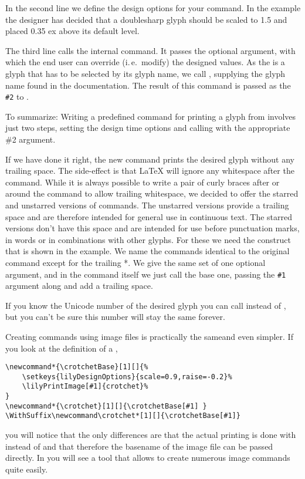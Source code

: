 \documentclass{OLLbook}
\begin{document}
In the second line we define the design options for your command.
In the example the designer has decided that a doublesharp glyph should be scaled to 1.5 and placed 0.35 ex above its default level.

The third line calls the internal  command. 
It passes the optional argument, with which the end user can override (i.\,e.\ modify) the designed values.
As the \doublesharp is a glyph that has to be selected by its glyph name, we call , supplying the glyph name found in the documentation.
The result of this command is passed as the \texttt{\#2} to .

To summarize: Writing a predefined command for printing a glyph from \emmentaler involves just two steps, setting the design time options and calling  with the appropriate \#2 argument.

\medskip
If we have done it right, the new command prints the desired glyph without any trailing space. 
The side-effect is that \LaTeX{} will ignore any whitespace after the command.
While it is always possible to write a pair of curly braces after or around the command to allow trailing whitespace, we decided to offer the starred and unstarred versions of commands.
The unstarred versions provide a trailing space and are therefore intended for general use in continuous text. 
The starred versions don't have this space and are intended for use before punctuation marks, in words or in combinations with other glyphs.
For these we need the  construct that is shown in the example.
We name the commands identical to the original command except for the trailing *.
We give the same set of one optional argument, and in the command itself we just call the base one, passing the \texttt{\#1} argument along and add a trailing space.

\medskip
If you know the Unicode number of the desired glyph you can call  instead of , but you can't be sure this number will stay the same forever.

\medskip
Creating commands using image files is practically the sameand even simpler.
If you look at the definition of a , 
\begin{verbatim}
\newcommand*{\crotchetBase}[1][]{%
    \setkeys{lilyDesignOptions}{scale=0.9,raise=-0.2}%
    \lilyPrintImage[#1]{crotchet}%
}
\newcommand*{\crotchet}[1][]{\crotchetBase[#1] }
\WithSuffix\newcommand\crotchet*[1][]{\crotchetBase[#1]}
\end{verbatim}
you will notice that the only differences are that the actual printing is done with  instead of  and that therefore the basename of the image file can be passed directly.
In  you will see a tool that allows to create numerous image commands quite easily.
\end{document}
